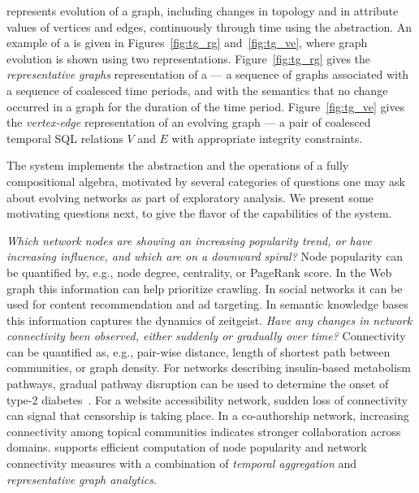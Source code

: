 \ql represents evolution of a graph, including changes in topology and
in attribute values of vertices and edges, continuously through time
using the \tg abstraction.  An example of a \tg is given in
Figures~\ref{fig:tg_rg} and~\ref{fig:tg_ve}, where graph evolution is
shown using two representations.  Figure~\ref{fig:tg_rg} gives the
{\em representative graphs} representation of a \tg --- a sequence of
graphs associated with a sequence of coalesced time periods, and with
the semantics that no change occurred in a graph for the duration of
the time period. Figure~\ref{fig:tg_ve} gives the {\em vertex-edge}
representation of an evolving graph --- a pair of coalesced temporal
SQL relations $V$ and $E$ with appropriate integrity constraints.


The \ql system implements the \tg abstraction and the
operations of a fully compositional \tg algebra, motivated by several
categories of questions one may ask about evolving networks as part of
exploratory analysis.  We present some motivating questions next, to
give the flavor of the capabilities of the \ql system.

{\em Which network nodes are showing an increasing popularity trend,
  or have increasing influence, and which are on a downward spiral?}
Node popularity can be quantified by, e.g., node degree, centrality,
or PageRank score.  In the Web graph this information can help
prioritize crawling.  In social networks it can be used for content
recommendation and ad targeting.  In semantic knowledge bases this
information captures the dynamics of zeitgeist.
%
{\em Have any changes in network connectivity been observed, either
  suddenly or gradually over time?} Connectivity can be quantified as,
e.g., pair-wise distance, length of shortest path between communities,
or graph density.  For networks describing insulin-based metabolism
pathways, gradual pathway disruption can be used to determine the
onset of type-2 diabetes~\cite{DBLP:journals/tcsb/BeyerTLSF10}.  For a
website accessibility network, sudden loss of connectivity can signal
that censorship is taking place. In a co-authorship network,
increasing connectivity among topical communities indicates stronger
collaboration across domains.
%
\ql supports efficient computation of node popularity and network
connectivity measures with a combination of {\em temporal aggregation}
and {\em representative graph analytics}.

